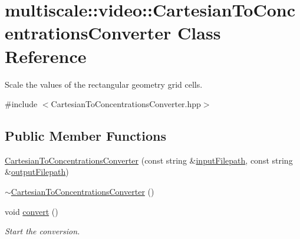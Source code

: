\hypertarget{classmultiscale_1_1video_1_1CartesianToConcentrationsConverter}{\section{multiscale\-:\-:video\-:\-:\-Cartesian\-To\-Concentrations\-Converter \-Class \-Reference}
\label{classmultiscale_1_1video_1_1CartesianToConcentrationsConverter}
}


\-Scale the values of the rectangular geometry grid cells.  




{\ttfamily \#include $<$\-Cartesian\-To\-Concentrations\-Converter.\-hpp$>$}

\subsection*{\-Public \-Member \-Functions}
\begin{DoxyCompactItemize}
\item 
\hyperlink{classmultiscale_1_1video_1_1CartesianToConcentrationsConverter_ae2f641fe6c2af730a5aedc83f4bc1244}{\-Cartesian\-To\-Concentrations\-Converter} (const string \&\hyperlink{classmultiscale_1_1video_1_1CartesianToConcentrationsConverter_affebbc7e1c67692bd529f19fc0451e58}{input\-Filepath}, const string \&\hyperlink{classmultiscale_1_1video_1_1CartesianToConcentrationsConverter_a9215448e33876a581b206a89b6651fd0}{output\-Filepath})
\item 
\hyperlink{classmultiscale_1_1video_1_1CartesianToConcentrationsConverter_a4250cb00af6f3c254c0577479ae25553}{$\sim$\-Cartesian\-To\-Concentrations\-Converter} ()
\item 
void \hyperlink{classmultiscale_1_1video_1_1CartesianToConcentrationsConverter_a27de97c7e35097bd17453fd07f33a6f1}{convert} ()
\begin{DoxyCompactList}\small\item\em \-Start the conversion. \end{DoxyCompactList}\end{DoxyCompactItemize}
